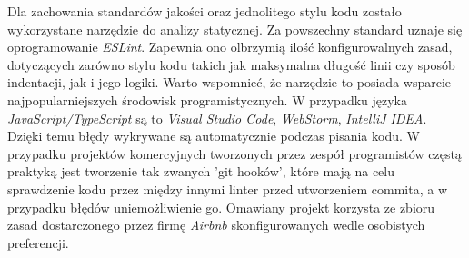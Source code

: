 \documentclass[skorowidz,skroty]{dyplomWEZUT}
\begin{document}
Dla zachowania standardów jakości oraz jednolitego stylu kodu zostało wykorzystane narzędzie do analizy statycznej. Za powszechny standard uznaje się oprogramowanie \textit{ESLint}. Zapewnia ono olbrzymią ilość konfigurowalnych zasad, dotyczących zarówno stylu kodu takich jak maksymalna długość linii czy sposób indentacji, jak i jego logiki. Warto wspomnieć, że narzędzie to posiada wsparcie najpopularniejszych środowisk programistycznych. W przypadku języka \textit{JavaScript/TypeScript} są to \textit{Visual Studio Code}, \textit{WebStorm}, \textit{IntelliJ IDEA}. Dzięki temu błędy wykrywane są automatycznie podczas pisania kodu. W przypadku projektów komercyjnych tworzonych przez zespół programistów częstą praktyką jest tworzenie tak zwanych 'git hooków', które mają na celu sprawdzenie kodu przez między innymi linter przed utworzeniem commita, a w przypadku błędów uniemożliwienie go. Omawiany projekt korzysta ze zbioru zasad dostarczonego przez firmę \textit{Airbnb} skonfigurowanych wedle osobistych preferencji.
\end{document}
